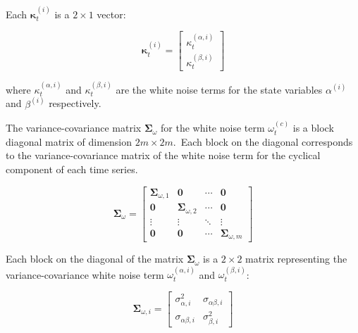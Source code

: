     Each $\bm{\kappa}_{t}^{(i)}$ is a $2 \times 1$ vector:

    \begin{equation}
        \bm{\kappa}_{t}^{(i)}=
            \left[
                \begin{array}{c}
                    \kappa_{t}^{(\alpha,i)} \\
                    \kappa_{t}^{(\beta,i)}
                \end{array}
            \right]
        \label{eq:cyclical_error}
    \end{equation}

    where $\kappa_{t}^{(\alpha,i)}$ and $\kappa_{t}^{(\beta,i)}$ are the white noise terms for the state variables
    $\alpha^{(i)}$ and $\beta^{(i)}$ respectively.

    The variance-covariance matrix $\bm{\Sigma}_{\omega}$ for the white noise term $\omega_t^{(c)}$ is a block diagonal
    matrix of dimension $2m \times 2m$.\ Each block on the diagonal corresponds to the variance-covariance matrix of the
    white noise term for the cyclical component of each time series.

    \begin{equation}
        \bm{\Sigma}_{\omega} =
            \left[
                \begin{array}{cccc}
                    \bm{\Sigma}_{\omega, 1} & \mathbf{0} & \cdots & \mathbf{0} \\
                    \mathbf{0} & \mathbf{\Sigma}_{\omega, 2} & \cdots & \mathbf{0} \\
                    \vdots & \vdots & \ddots & \vdots \\
                    \mathbf{0} & \mathbf{0} & \cdots & \mathbf{\Sigma}_{\omega, m}
                \end{array}
            \right]
        \label{eq:cyclical_covariance}
    \end{equation}

    Each block on the diagonal of the matrix $\bm{\Sigma}_{\omega}$ is a $2 \times 2$ matrix representing the variance-covariance
    white noise term $\omega_t^{(\alpha, i)}$ and $\omega_t^{(\beta, i)}$:

    \begin{equation}
        \bm{\Sigma}_{\omega, i} =
            \left[
                \begin{array}{cc}
                    \sigma_{\alpha, i}^2    & \sigma_{\alpha\beta, i} \\
                    \sigma_{\alpha\beta, i} & \sigma_{\beta, i}^2
                \end{array}
            \right]
        \label{eq:cyclical_covariance_block}
    \end{equation}

